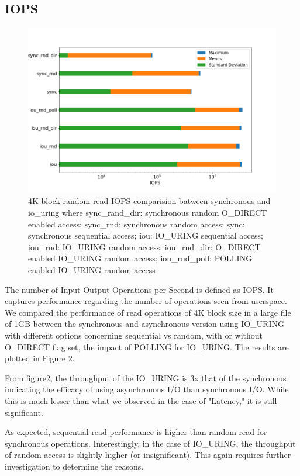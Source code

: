 \documentclass{article}
\begin{document}
\subsection{IOPS}
\begin{figure}
    \centering
    \includegraphics[scale = 0.4]{iops.png}
    \caption{4K-block random read IOPS comparision batween synchronous 
    and io\_uring where
    sync\_rand\_dir: synchronous random O\_DIRECT enabled access;
    sync\_rnd: synchronous random access;
    sync: synchronous sequential access;
    iou: IO\_URING sequential access;
    iou\_rnd: IO\_URING random access;
    iou\_rnd\_dir: O\_DIRECT enabled IO\_URING random access;
    iou\_rnd\_poll: POLLING enabled IO\_URING random access
    }
    \label{Figure2}
\end{figure}
The number of Input Output Operations per Second is defined as IOPS. It captures performance regarding the number of operations 
seen from userspace. We compared the performance of read operations of 4K block size in a large file of 1GB between the 
synchronous and asynchronous version using IO\_URING with different options concerning sequential vs random, with or without 
O\_DIRECT flag set, the impact of POLLING for IO\_URING. The results are plotted in Figure 2.

From figure2, the throughput of the IO\_URING is 3x that of the synchronous indicating the efficacy of using asynchronous I/O than 
synchronous I/O. While this is much lesser than what we observed in the case of "Latency," it is still significant. 

As expected, sequential read performance is higher than random read for synchronous operations. Interestingly, in the case of 
IO\_URING, the throughput of random access is slightly higher (or insignificant). This again requires further investigation to 
determine the reasons.
\end{document}
